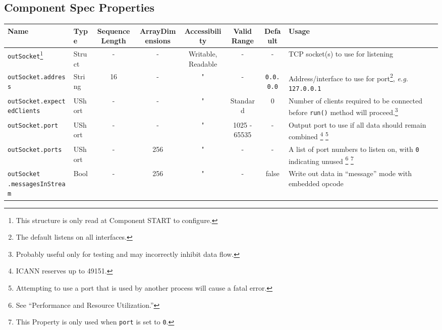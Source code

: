 \documentclass{article}
\begin{document}
\begin{landscape}
  \section*{Component Spec Properties}
  \begin{minipage}{\textwidth}
    \renewcommand*\footnoterule{} %
    \renewcommand{\thempfootnote}{\arabic{mpfootnote}} %
  \begin{scriptsize}
    \begin{tabular}{|p{3.2cm}|p{1.5cm}|c|c|c|c|c|p{7cm}|}
      \hline
      \rowcolor{blue}
      Name                          & Type      & SequenceLength & ArrayDimensions & Accessibility      & Valid Range & Default       & Usage \\
      \hline
      \verb+outSocket+\footnote{This structure is only read at Component START to configure.} & Struct & - & - & Writable, Readable & - & - & TCP socket(s) to use for listening \\
      \hline
      \verb+outSocket.address+      & String    & 16             & -               & "                  & -           & \verb+0.0.0.0+ & Address/interface to use for port\footnote{The default listens on all interfaces.}, \textit{e.g.} \verb+127.0.0.1+ \\
      \hline
      \verb+outSocket.expectedClients+      & UShort    & -             & -               & "                  & Standard           & 0 & Number of clients required to be connected before \verb+run()+ method will proceed.\footnote{Probably useful only for testing and may incorrectly inhibit data flow.} \\
      \hline
      \verb+outSocket.port+         & UShort    & -              & -               & "                  & 1025 - 65535 & -            & Output port to use if all data should remain combined \footnote{ICANN reserves up to 49151.} \footnote{Attempting to use a port that is used by another process will cause a fatal error.} \\
      \hline
      \verb+outSocket.ports+        & UShort    & -              & 256             & "                  & -           & -             & A list of port numbers to listen on, with \verb+0+ indicating unused \footnote{See ``Performance and Resource Utilization.''} \footnote{This Property is only used when \texttt{port} is set to \texttt{0}.}\\
      \hline
      \verb+outSocket+ \verb+.messagesInStream+ & Bool & -       & 256             & "                  & -           & false         & Write out data in ``message'' mode with embedded opcode \\

\end{tabular}
\end{scriptsize}
\end{minipage}
\end{landscape}
\end{document}
